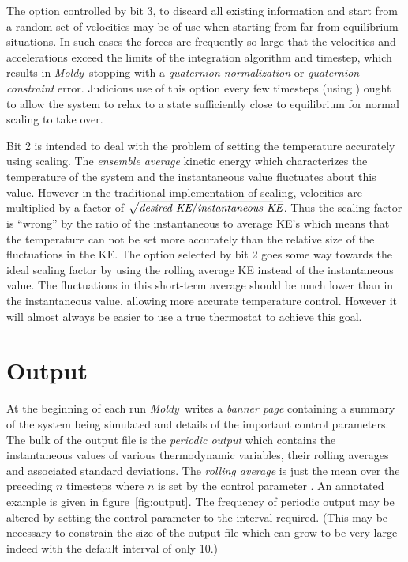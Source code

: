 \documentclass[a4paper,twoside]{report}
\newcommand{\moldy}{\emph{Moldy}}
\begin{document}
The option controlled by bit 3, to discard all existing information
and start from a random set of velocities may be of use when starting
from far-from-equilibrium situations.  In such cases the forces are
frequently so large that the velocities and accelerations exceed the
limits of the integration algorithm and timestep, which results in
\moldy\ stopping with a \emph{quaternion normalization} or
\emph{quaternion constraint} error.  Judicious use of this option
every few timesteps (using ) ought to allow the
system to relax to a state sufficiently close to equilibrium for
normal scaling to take over.

Bit 2 is intended to deal with the problem of setting the temperature
accurately using scaling.  The \emph{ensemble average} kinetic energy
which characterizes the temperature of the system and the
instantaneous value fluctuates about this value.  However in the
traditional implementation of scaling, velocities are multiplied by a
factor of $\sqrt{\emph{desired KE} / {\emph{instantaneous KE}}}$.
Thus the scaling factor is ``wrong'' by the ratio of the instantaneous
to average KE's which means that the temperature can not be set more
accurately than the relative size of the fluctuations in the KE\@.
The option selected by bit 2 goes some way towards the ideal scaling
factor by using the rolling average KE instead of the instantaneous
value.  The fluctuations in this short-term average should be much
lower than in the instantaneous value, allowing more accurate
temperature control.  However it will almost always be easier to use a
true thermostat to achieve this goal.


\section{Output}%
\label{sec:output}
At the beginning of each run \moldy\ writes a \emph{banner page}
containing a summary of the system being simulated and details of the
important control parameters. The bulk of the output file is the
\emph{periodic output} which contains the instantaneous values of
various thermodynamic variables, their rolling averages and associated
standard deviations. The \emph{rolling average} is just the mean over
the preceding $n$ timesteps where $n$ is set by the control parameter
.  An annotated example is given in
figure~\ref{fig:output}.  The frequency of periodic output may be
altered by setting the control parameter  to
the interval required.  (This may be necessary to constrain the size
of the output file which can grow to be very large indeed with the
default interval of only 10.)
\end{document}
